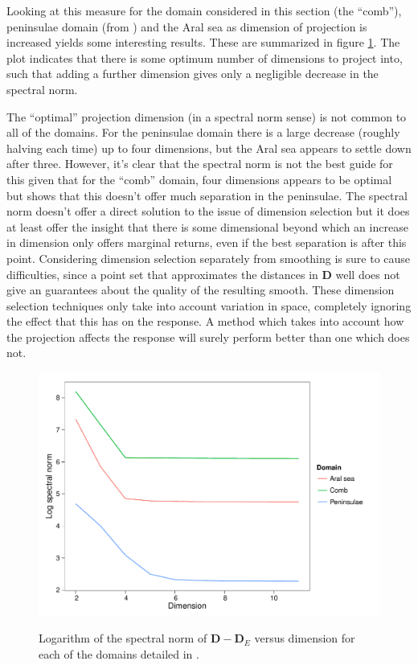 Looking at this measure for the domain considered in this section (the ``comb''), peninsulae domain (from ) and the Aral sea as dimension of projection is increased yields some interesting results. These are summarized in figure \ref{increasek}. The plot indicates that there is some optimum number of dimensions to project into, such that adding a further dimension gives only a negligible decrease in the spectral norm. 

The ``optimal'' projection dimension (in a spectral norm sense) is not common to all of the domains. For the peninsulae domain there is a large decrease (roughly halving each time) up to four dimensions, but the Aral sea appears to settle down after three. However, it's clear that the spectral norm is not the best guide for this given that for the ``comb'' domain, four dimensions appears to be optimal but  shows that this doesn't offer much separation in the peninsulae. The spectral norm doesn't offer a direct solution to the issue of dimension selection but it does at least offer the insight that there is some dimensional beyond which an increase in dimension only offers marginal returns, even if the best separation is after this point. Considering dimension selection separately from smoothing is sure to cause difficulties, since a point set that approximates the distances in $\mathbf{D}$ well does not give an guarantees about the quality of the resulting smooth. These dimension selection techniques only take into account variation in space, completely ignoring the effect that this has on the response. A method which takes into account how the projection affects the response will surely perform better than one which does not.

\begin{figure}
\includegraphics[width=\textwidth]{mds/figs/eigenplot.pdf} \\
\caption{Logarithm of the spectral norm of $\mathbf{D}-\mathbf{D}_E$ versus dimension for each of the domains detailed in .}
\label{increasek}
\end{figure}

